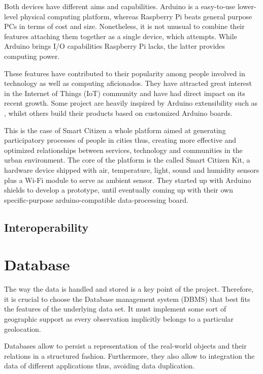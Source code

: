 Both devices have different aims and capabilities. Arduino is a easy-to-use lower-level physical computing platform, whereas Raspberry Pi beats general purpose PCs in terms of cost and size. Nonetheless, it is not unusual to combine their features attaching them together as a single device, which \cite{Arduberry} attempts. While Arduino brings I/O capabilities Raspberry Pi lacks, the latter provides computing power.

These features have contributed to their popularity among people involved in technology as well as computing aficionados. They have attracted great interest in the Internet of Things (IoT) community and have had direct impact on its recent growth. Some project are heavily inspired by Arduino extensibility such as \cite{Thinking-Things}, whilst others build their products based on customized Arduino boards. 

This is the case of Smart Citizen a whole platform aimed at generating participatory processes of people in cities thus, creating more effective and optimized relationships between services, technology and communities in the urban environment. The core of the platform is the called Smart Citizen Kit, a hardware device shipped with air, temperature, light, sound and humidity sensors plus a Wi-Fi module to serve as ambient sensor. They started up with Arduino shields to develop a prototype, until eventually coming up with their own specific-purpose arduino-compatible data-processing board.

\subsection{Interoperability}



\section{Database}

The way the data is handled and stored is a key point of the project. Therefore, it is crucial to choose the Database management system (DBMS) that best fits the features of the underlying data set. It must implement some sort of geographic support as every observation implicitly belongs to a particular geolocation.

Databases allow to persist a representation of the real-world objects and their relations in a structured fashion. Furthermore, they also allow to integration the data of different applications thus, avoiding data duplication. 

